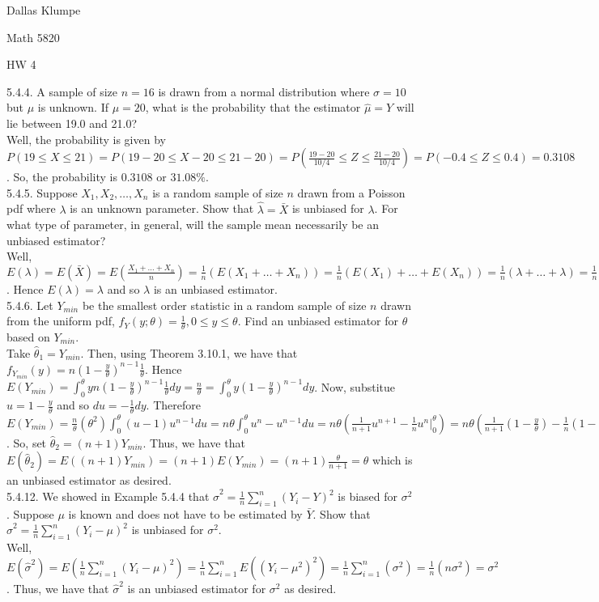 \documentclass[12pt]{article}
\begin{document}
\noindent Dallas Klumpe

\noindent Math 5820

\noindent HW 4

5.4.4. A sample of size $n=16$ is drawn from a normal distribution where $\sigma=10$ but $\mu$ is unknown. If $\mu=20$, what is the probability that the estimator $\hat{\mu}=Y$ will lie between 19.0 and 21.0?\\
Well, the probability is given by $P(19\leq X\leq21)=P(19-20\leq X-20\leq21-20)=P(\frac{19-20}{10/4}\leq Z\leq\frac{21-20}{10/4})=P(-0.4\leq Z\leq0.4)=0.3108$. So, the probability is $0.3108$ or $31.08\%$.\\[20pt]

5.4.5. Suppose $X_1, X_2,\ldots, X_n$ is a random sample of size $n$ drawn from a Poisson pdf where $\lambda$ is an unknown parameter. Show that $\hat{\lambda}=\bar{X}$ is unbiased for $\lambda$. For what type of parameter, in general, will the sample mean necessarily be an unbiased estimator?\\
Well, $E(\lambda)=E(\bar{X})=E(\frac{X_1+\ldots+X_n}{n})=\frac1n(E(X_1+\ldots+X_n))=\frac1n(E(X_1)+\ldots+E(X_n))=\frac1n(\lambda+\ldots+\lambda)=\frac1n(n\lambda)=\lambda$. Hence $E(\lambda)=\lambda$ and so $\lambda$ is an unbiased estimator.\\[20pt]

5.4.6. Let $Y_{min}$ be the smallest order statistic in a random sample of size $n$ drawn from the uniform pdf, $f_Y (y;\theta)=\frac{1}{\theta}, 0\leq y\leq\theta$. Find an unbiased estimator for $\theta$ based on $Y_{min}$.\\
Take $\hat{\theta}_1=Y_{min}$. Then, using Theorem 3.10.1, we have that $f_{Y_{min}}(y)=n(1-\frac{y}{\theta})^{n-1}\frac{1}{\theta}$. Hence $E(Y_{min})=\int_0^{\theta}yn(1-\frac{y}{\theta})^{n-1}\frac{1}{\theta}dy=\frac{n}{\theta}=\int_0^{\theta}y(1-\frac{y}{\theta})^{n-1}dy$. Now, substitue $u=1-\frac{y}{\theta}$ and so $du=-\frac{1}{\theta}dy$. Therefore $E(Y_{min})=\frac{n}{\theta}(\theta^2)\int_0^{\theta}(u-1)u^{n-1}du=n\theta\int_0^{\theta}u^n-u^{n-1}du=n\theta(\frac{1}{n+1}u^{n+1}-\frac1nu^n|_0^{\theta})=n\theta(\frac{1}{n+1}(1-\frac{y}{\theta})-\frac1n(1-\frac{y}{\theta})|_0^{\theta})=n\theta(\frac1n-\frac{1}{n+1})=\frac{\theta}{n+1}\neq\theta$. So, set $\hat{\theta}_2=(n+1)Y_{min}$. Thus, we have that $E(\hat{\theta}_2)=E((n+1)Y_{min})=(n+1)E(Y_{min})=(n+1)\frac{\theta}{n+1}=\theta$ which is an unbiased estimator as desired.\\[20pt]

5.4.12.  We showed in Example 5.4.4 that $\hat{\sigma}^2=\frac1n\sum_{i=1}^n(Y_i -Y)^2$ is biased for $\sigma^2$. Suppose $\mu$ is known and does not have to be estimated by $\bar{Y}$. Show that $\hat{\sigma}^2=\frac1n\sum_{i=1}^n(Y_i-\mu)^2$ is unbiased for $\sigma^2$.\\
Well, $E(\hat{\sigma}^2)=E(\frac1n\sum_{i=1}^n(Y_i-\mu)^2)=\frac1n\sum_{i=1}^nE((Y_i-\mu^2)^2)=\frac1n\sum_{i=1}^n(\sigma^2)=\frac1n(n\sigma^2)=\sigma^2$. Thus, we have that $\hat{\sigma}^2$ is an unbiased estimator for $\sigma^2$ as desired.
\end{document}
